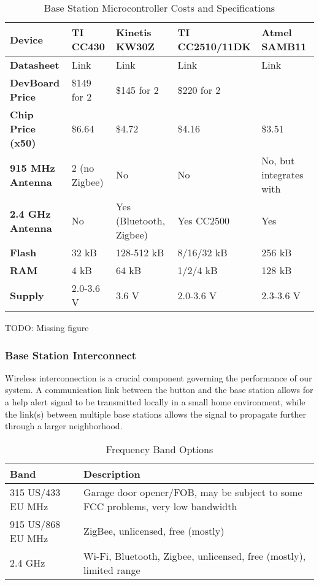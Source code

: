 \documentclass[journal,compsoc]{IEEEtran}
\begin{document}
\begin{table*}[t]
  \centering
  \begin{tabular}{>{\bfseries}l|l l l l}
    Device & TI CC430 & Kinetis KW30Z & TI CC2510/11DK & Atmel SAMB11 \\
    \hline
    Datasheet & Link & Link & Link & Link \\
    DevBoard Price & \$149 for 2 & \$145 for 2 & \$220 for 2 & \\
    Chip Price (x50) & \$6.64 & \$4.72 & \$4.16 & \$3.51 \\
    915 MHz Antenna & 2 (no Zigbee) & No & No & No, but integrates with \\
    2.4 GHz Antenna & No & Yes (Bluetooth, Zigbee) & Yes CC2500 & Yes \\
    Flash & 32 kB & 128-512 kB & 8/16/32 kB & 256 kB \\
    RAM & 4 kB & 64 kB & 1/2/4 kB & 128 kB \\
    Supply & 2.0-3.6 V & 3.6 V & 2.0-3.6 V & 2.3-3.6 V
  \end{tabular}
  \caption{Base Station Microcontroller Costs and Specifications}
\end{table*}

TODO: Missing figure

\subsubsection{Base Station Interconnect}

Wireless interconnection is a crucial component governing the performance of our system.  A communication link between the button and the base station allows for a help alert signal to be transmitted locally in a small home environment, while the link(s) between multiple base stations allows the signal to propagate further through a larger neighborhood.\\

\begin{table*}[t]
  \centering
  \begin{tabular}{l|l}
    Band & Description \\
    \hline
    315 US/433 EU MHz & Garage door opener/FOB, may be subject to some FCC problems, very low bandwidth \\
    915 US/868 EU MHz & ZigBee, unlicensed, free (mostly) \\
    2.4 GHz & Wi-Fi, Bluetooth, Zigbee, unlicensed, free (mostly), limited range
  \end{tabular}
  \caption{Frequency Band Options}
\end{table*}
\end{document}

